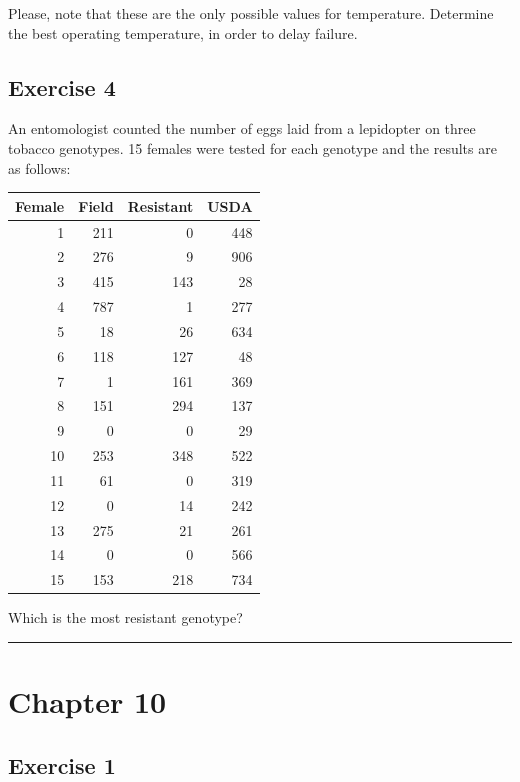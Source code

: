 \documentclass[a4paper,12pt,oneside]{book}
\begin{document}
Please, note that these are the only possible values for temperature. Determine the best operating temperature, in order to delay failure.

\hypertarget{exercise-4-3}{%
\subsection{Exercise 4}\label{exercise-4-3}}

An entomologist counted the number of eggs laid from a lepidopter on three tobacco genotypes. 15 females were tested for each genotype and the results are as follows:

\begin{longtable}[]{@{}rrrr@{}}
\toprule
Female & Field & Resistant & USDA \\
\midrule
\endhead
1 & 211 & 0 & 448 \\
2 & 276 & 9 & 906 \\
3 & 415 & 143 & 28 \\
4 & 787 & 1 & 277 \\
5 & 18 & 26 & 634 \\
6 & 118 & 127 & 48 \\
7 & 1 & 161 & 369 \\
8 & 151 & 294 & 137 \\
9 & 0 & 0 & 29 \\
10 & 253 & 348 & 522 \\
11 & 61 & 0 & 319 \\
12 & 0 & 14 & 242 \\
13 & 275 & 21 & 261 \\
14 & 0 & 0 & 566 \\
15 & 153 & 218 & 734 \\
\bottomrule
\end{longtable}

Which is the most resistant genotype?

\begin{center}\rule{0.5\linewidth}{0.5pt}\end{center}

\hypertarget{chapter-10}{%
\section{Chapter 10}\label{chapter-10}}

\hypertarget{exercise-1-5}{%
\subsection{Exercise 1}\label{exercise-1-5}}
\end{document}
